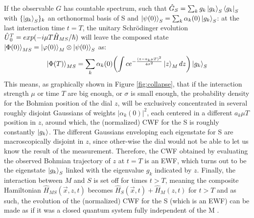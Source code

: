 \documentclass[11pt, a4paper]{article} %
\begin{document}
If the observable $G$ has countable spectrum, such that $\hat{G}_S=\sum_k g_k \ket{g_k}_S\bra{g_k}_S$ with $\{\ket{g_k}_S\}_k$ an orthonormal basis of S and $\ket{\psi(0)}_S=\sum_k \alpha_k(0)\ket{g_k}_S$: at the last interaction time $t=T$, the unitary Schrödinger evolution $\hat{U} \null_{0}^T=exp(-i\mu T \hat{H}_{MS}/\hbar)$ will leave the composed state $\ket{\Phi(0)}_{MS}=\ket{\varphi(0)}_M\otimes\ket{\psi(0)}_S$ as:
\begin{equation}\label{postM1}
\ket{\Phi(T)}_{MS}=\sum_k \alpha_k(0)\qty(\int c e^{-\frac{(z-a_k\mu T)^2}{4\sigma^2}}\ket{z}_M dz )\ket{g_k}_S
\end{equation}
This means, as graphically shown in Figure \ref{fig:collapse}, that if the interaction strength $\mu$ or time $T$ are big enough, or $\sigma$ is small enough, the probability density for the Bohmian position of the dial $z$, will be exclusively concentrated in several roughly disjoint Gaussians of weights $|\alpha_k(0)|^2$, each centered in a different $a_k \mu T$ position in $z$, around which, the (normalized) CWF for the S is roughly constantly $\ket{g_k}$. The different Gaussians enveloping each eigenstate for S are macroscopically disjoint in $z$, since other-wise the dial would not be able to let us know the result of the measurement. Therefore, the CWF obtained by evaluating the observed Bohmian trajectory of $z$ at $t=T$ is an EWF, which turns out to be the eigenstate $\ket{g_k}_S$ linked with the eigenvalue $g_k$ indicated by $z$. Finally, the interaction between $M$ and $S$ is set off for times $t>T$, meaning the composite Hamiltonian $\hat{H}_{MS}(\vec{x},z,t)$ becomes $\hat{H}_S(\vec{x},t)+\hat{H}_M(z,t)$ for $t>T$ and as such, the evolution of the (normalized) CWF for the S (which is an EWF) can be made as if it was a closed quantum system fully independent of the M \cite{JordiXavier}. 

\end{document}
